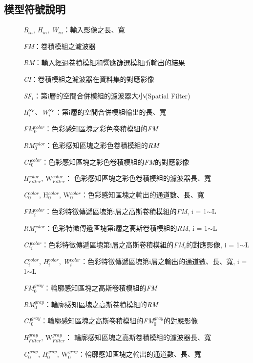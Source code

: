 \documentclass[class=NCU_thesis, crop=false]{standalone}
\begin{document}
\pagebreak

\subsection{模型符號說明}
	\begin{description}
		\item[]\textit{B}$_{in}$, \textit{H}$_{in}$, \textit{W}$_{in}$：輸入影像之長、寬

		\item[]\textit{FM}：卷積模組之濾波器
		\item[]\textit{RM}：輸入經過卷積模組和響應篩選模組所輸出的結果
		\item[]\textit{CI}：卷積模組之濾波器在資料集的對應影像
		\item[]\textit{SF}$_{i}$：第i層的空間合併模組的濾波器大小(Spatial Filter)
		\item[]\textit{H}$^{SF}_{i}$、\textit{W}$^{SF}_{i}$：第i層的空間合併模組輸出的長、寬

		\item[]\textit{FM}$^{color}_{0}$：色彩感知區塊之彩色卷積模組的\textit{FM}
		\item[]\textit{RM}$^{color}_{0}$：色彩感知區塊之彩色卷積模組的\textit{RM}
		\item[]\textit{CI}$^{color}_{0}$：色彩感知區塊之彩色卷積模組的\textit{FM}的對應影像
		\item[]\textit{H}$^{color}_{Filter}$, {W}$^{color}_{Filter}$： 色彩感知區塊之彩色卷積模組的濾波器長、寬
		\item[]\textit{C}$^{color}_{0}$, {H}$^{color}_{0}$, {W}$^{color}_{0}$：色彩感知區塊之輸出的通道數、長、寬

		\item[]\textit{FM}$^{color}_{i}$：色彩特徵傳遞區塊第i層之高斯卷積模組的\textit{FM}, i = 1$\sim$L
		\item[]\textit{RM}$^{color}_{i}$：色彩特徵傳遞區塊第i層之高斯卷積模組的\textit{RM}, i = 1$\sim$L
		\item[]\textit{CI}$^{color}_{i}$：色彩特徵傳遞區塊第i層之高斯卷積模組的\textit{FM}$_{i}$的對應影像, i = 1$\sim$L
		\item[]\textit{C}$^{color}_{i}$, \textit{H}$^{color}_{i}$, \textit{W}$^{color}_{i}$：色彩特徵傳遞區塊第i層之輸出的通道數、長、寬, i = 1$\sim$L
		
		\item[]\textit{FM}$^{gray}_{0}$：輪廓感知區塊之高斯卷積模組的\textit{FM}
		\item[]\textit{RM}$^{gray}_{0}$：輪廓感知區塊之高斯卷積模組的\textit{RM}
		\item[]\textit{CI}$^{gray}_{0}$：輪廓感知區塊之高斯卷積模組的\textit{FM}$^{gray}_{0}$的對應影像
		\item[]\textit{H}$^{gray}_{Filter}$, {W}$^{gray}_{Filter}$： 輪廓感知區塊之高斯卷積模組的濾波器長、寬
		\item[]\textit{C}$^{gray}_{0}$, \textit{H}$^{gray}_{0}$, {W}$^{gray}_{0}$：輪廓感知區塊之輸出的通道數、長、寬


\end{description}
\end{document}

